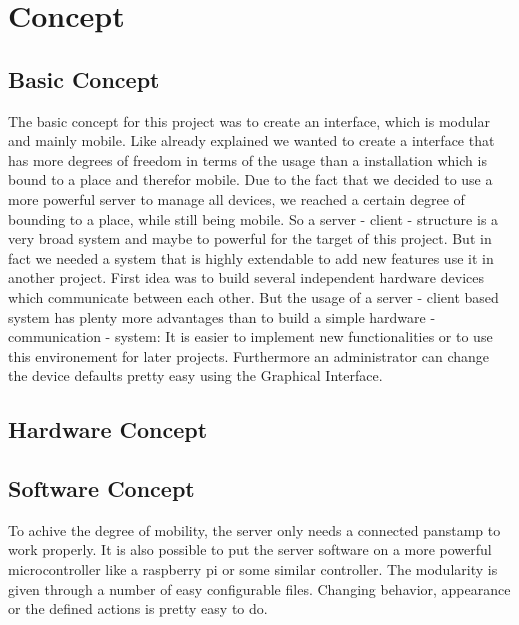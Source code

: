 \section{Concept}

\subsection{Basic Concept}
The basic concept for this project was to create an interface, which is modular and mainly mobile. Like already explained we wanted to create a interface that has more degrees of freedom in terms of the usage than a installation which is bound to a place and therefor mobile. Due to the fact that we decided to use a more powerful server to manage all devices, we reached a certain degree of bounding to a place, while still being mobile. 
So a server - client - structure is a very broad system and maybe to powerful for the target of this project. But in fact we needed a system that is highly extendable to add new features use it in another project.
First idea was to build several independent hardware devices which communicate between each other. But the usage of a server - client based system has plenty more advantages than to build a simple hardware - communication - system:
It is easier to implement new functionalities or to use this environement for later projects. Furthermore an administrator can change the device defaults pretty easy using the Graphical Interface.   
\subsection{Hardware Concept}

\subsection{Software Concept} 
To achive the degree of mobility, the server only needs a connected panstamp to work properly. It is also possible to put the server software on a more powerful microcontroller like a raspberry pi or some similar controller.
The modularity is given through a number of easy configurable files. Changing behavior, appearance or the defined actions is pretty easy to do.

